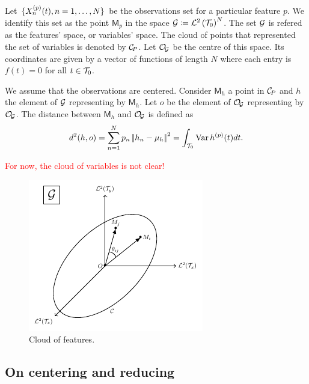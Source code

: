 Let $\{X_n^{(p)}(t), n = 1, \dots, N\}$ be the observations set for a particular feature $p$. We identify this set as the point $\mathsf{M}_p$ in the space $\mathcal{G} \coloneqq \mathcal{L}^{2}\left(\mathcal{T}_{0}\right)^N$. The set $\mathcal{G}$ is refered as the features' space, or variables' space. The cloud of points that represented the set of variables is denoted by $\mathcal{C}_{\!P}$. Let $\mathcal{O}_{\!\mathcal{G}}$ be the centre of this space. Its coordinates are given by a vector of functions of length $N$ where each entry is $f(t) = 0$ for all $t \in \mathcal{T}_{0}$.

We assume that the observations are centered. Consider $\mathsf{M}_h$ a point in $\mathcal{C}_{\!P}$ and $h$ the element of $\mathcal{G}$ representing by $\mathsf{M}_h$. Let $o$ be the element of $\mathcal{O}_{\!\mathcal{G}}$ representing by $\mathcal{O}_{\!\mathcal{G}}$. The distance between $\mathsf{M}_h$ and $\mathcal{O}_{\!\mathcal{G}}$ is defined as
\begin{equation*}
d^2(h, o) = \sum_{n = 1}^N p_n \left|\!\left|h_n - \mu_h\right|\!\right|^2 = \int_{\mathcal{T}_{0}} \operatorname{Var} h^{(p)}(t)dt.
\end{equation*} 

\textcolor{red}{For now, the cloud of variables is not clear!}

\begin{figure}
    \centering
    \includegraphics[scale=1.2]{figures/cloud_features.pdf}
    \caption{Cloud of features.}
    \label{fig:cloud_features}
\end{figure}

\subsection{On centering and reducing} %
\label{sub:on_centering_and_reducing}

